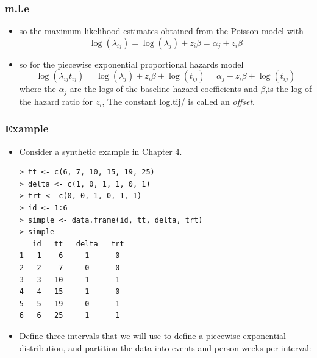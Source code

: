 \documentclass{beamer}
\newcommand{\empr}[1]{{\emph{\color{red}#1}}}
\begin{document}
\pagebreak
\begin{frame}
\frametitle{m.l.e}
\begin{itemize}
\item so the maximum likelihood estimates obtained from the Poisson model with
\begin{equation}
\log( \lambda_{ij}) = \log(\lambda_j) + z_i\beta = \alpha_j + z_i\beta
\end{equation}
\item so for the piecewise exponential proportional hazards model
\begin{equation}
\log( \lambda_{ij}t_{ij}) = \log(\lambda_j) + z_i\beta +\log(t_{ij})= \alpha_j + z_i\beta +\log(t_{ij})
\end{equation}
where the $\alpha_j$ are the logs of the baseline hazard coefficients and $\beta$,is the log of the hazard ratio for $z_i$, The constant log.tij/ is called an \empr{offset}.
\end{itemize}
\end{frame}

\pagebreak
\begin{frame}[fragile]
\frametitle{Example}
\begin{itemize}
\item Consider a synthetic example in Chapter 4.
\begin{Verbatim}
> tt <- c(6, 7, 10, 15, 19, 25)
> delta <- c(1, 0, 1, 1, 0, 1)
> trt <- c(0, 0, 1, 0, 1, 1)
> id <- 1:6
> simple <- data.frame(id, tt, delta, trt)
> simple
   id   tt   delta   trt 
1   1    6     1      0 
2   2    7     0      0 
3   3   10     1      1 
4   4   15     1      0 
5   5   19     0      1 
6   6   25     1      1
\end{Verbatim}
\item Define three intervals that we will use to define a piecewise exponential distribution, and partition the data into
events and person-weeks per interval:
\end{itemize}
\end{frame}
\end{document}
